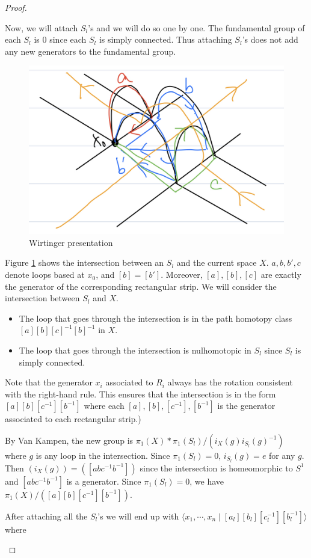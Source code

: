 \documentclass[12pt, psamsfonts]{amsart}
\theoremstyle{definition}
\theoremstyle{remark}
\numberwithin{equation}{section}
\begin{document}
\begin{proof}
\begin{itemize}
      Now, we will attach $S_l$'s and we will do so one by one.
      The fundamental group of each $S_l$ is $0$ since each $S_l$ is simply connected.
      Thus attaching $S_l$'s does not add any new generators to the fundamental group.
      \begin{figure}
        \includegraphics[width=.5\linewidth]{wirtinger.jpeg}
        \caption{Wirtinger presentation}
        \label{fig:wirtinger}
      \end{figure}
      Figure \ref{fig:wirtinger} shows the intersection between an $S_l$ and the current space $X$.
      $a, b, b', c$ denote loops based at $x_0$, and $[b] = [b']$.
      Moreover, $[a], [b], [c]$ are exactly the generator of the corresponding rectangular strip.
      We will consider the intersection between $S_l$ and $X$.
      \begin{itemize}
        \item
          The loop that goes through the intersection is in the path homotopy class $[a][b][c]^{-1}[b]^{-1}$ in $X$.
        \item
          The loop that goes through the intersection is nulhomotopic in $S_l$ since $S_l$ is simply connected.
      \end{itemize}

      Note that the generator $x_i$ associated to $R_i$ always has the rotation consistent with the right-hand rule.
      This ensures that the intersection is in the form $[a][b][c^{-1}][b^{-1}]$ where each $[a], [b], [c^{-1}], [b^{-1}]$ is the generator associated to each rectangular strip.)

      By Van Kampen, the new group is $\pi_1(X) * \pi_1(S_l) / (i_{X}(g)i_{S_l}(g)^{-1})$ where $g$ is any loop in the intersection.
      Since $\pi_1(S_l) = 0$, $i_{S_l}(g) = e$ for any $g$.
      Then $(i_X(g)) = ([abc^{-1}b^{-1}])$ since the intersection is homeomorphic to $S^1$ and $[abc^{-1}b^{-1}]$ is a generator.
      Since $\pi_1(S_l) = 0$, we have $\pi_1(X) / ([a][b][c^{-1}][b^{-1}])$.

      After attaching all the $S_l$'s we will end up with $\langle x_1, \cdots, x_n \mid [a_l][b_l][c_l^{-1}][b_l^{-1}] \rangle$ where


\end{itemize}
\end{proof}
\end{document}
